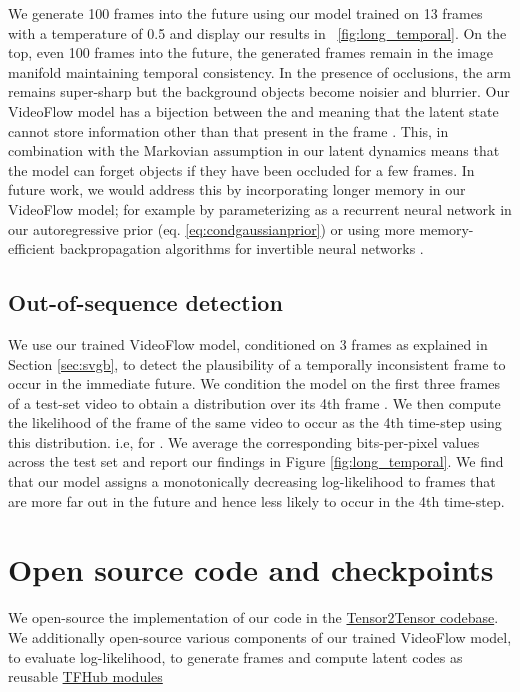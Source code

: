\documentclass{article} \usepackage{iclr2020_conference,times}
\newcommand{\figref}[1]{\figurename~\ref{#1}}
\begin{document}
We generate 100 frames into the future using our model trained on 13 frames with a temperature of 0.5 and display our results in \figref{fig:long_temporal}. On the top, even 100 frames into the future, the generated frames remain in the image manifold maintaining temporal consistency. In the presence of occlusions, the arm remains super-sharp but the background objects become noisier and blurrier. Our VideoFlow model has a bijection between the  and  meaning that the latent state  cannot store information other than that present in the frame . This, in combination with the Markovian assumption in our latent dynamics means that the model can forget objects if they have been occluded for a few frames. In future work, we would address this by incorporating longer memory in our VideoFlow model; for example by parameterizing  as a recurrent neural network in our autoregressive prior (eq. \ref{eq:condgaussianprior}) or using more memory-efficient backpropagation algorithms for invertible neural networks \citep{gomez2017reversible}.

\subsection{Out-of-sequence detection}
\label{oos-dec}
We use our trained VideoFlow model, conditioned on 3 frames as explained in Section \ref{sec:svgb}, to detect the
plausibility of a temporally inconsistent frame to occur in the immediate future. We condition the model on the first three frames of a test-set video  to obtain a distribution  over its 4th frame . We then compute the likelihood of the  frame  of the same video to occur as the 4th time-step using this distribution. i.e,  for . We average the corresponding bits-per-pixel values across the test set and report our findings in Figure \ref{fig:long_temporal}. We find that our model 
assigns a monotonically decreasing log-likelihood to frames that are more far out in the future and hence less likely to occur in the 4th time-step.

\section{Open source code and checkpoints}

We open-source the implementation of our code in the \href{https://github.com/tensorflow/tensor2tensor/blob/master/tensor2tensor/models/video/next_frame_glow.py}{Tensor2Tensor codebase}. We additionally open-source various components of our trained VideoFlow model, to evaluate log-likelihood, to generate frames and compute latent codes as reusable \href{https://tfhub.dev/s?q=videoflow}{TFHub modules}
\end{document}
